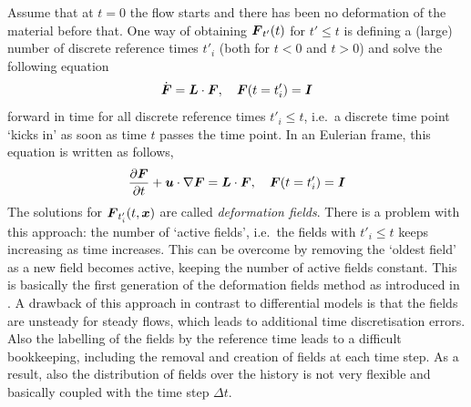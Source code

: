 Assume that at $t=0$ the flow starts and there has been no deformation of the material before that.
One way of obtaining $\boldsymbol{F}_{t'}(t)$ for $t'\leq t$ is defining a (large) number of discrete reference times $t'_i$ (both for $t<0$ and $t>0$)
and solve the following equation
\begin{equation}
  \dot {\boldsymbol{F}}=\boldsymbol{L}\cdot \boldsymbol{F}, \quad \boldsymbol{F}(t=t'_i)=\boldsymbol{I}\label{eq:Fevolution}
\end{equation}
forward in time for all discrete reference times $t'_i\le t$, i.e.\ a discrete time point `kicks in' as soon as time $t$ passes the time point.  In an Eulerian frame, this equation is written as follows,
\begin{equation}
  \dfrac{\partial \boldsymbol{F}}{\partial t}+\boldsymbol{u}\cdot\nabla\boldsymbol{F}=\boldsymbol{L}\cdot \boldsymbol{F}, \quad \boldsymbol{F}(t=t'_i)=\boldsymbol{I}\label{eq:FevolutionEuler}
\end{equation}
The solutions for $\boldsymbol{F}_{t'_i}(t,\boldsymbol{x})$ are called \emph{deformation fields}.
There is a problem with this approach: the number of `active fields', i.e.\ the fields with $t'_i\le t$ keeps increasing as time increases.
This can be overcome by removing the `oldest field' as a new field becomes active, keeping the number of active fields constant.
This is basically the first generation of the deformation fields method as introduced in \cite{Peters2000b}. A drawback of this approach
in contrast to differential models is that the fields are unsteady for steady flows, which leads to additional time discretisation errors. Also the labelling of the fields by the reference time leads to a difficult bookkeeping, including the removal and creation of fields at each time step. As a result, also the distribution of fields over the history is not very flexible and basically coupled with the time step $\Delta t$.

